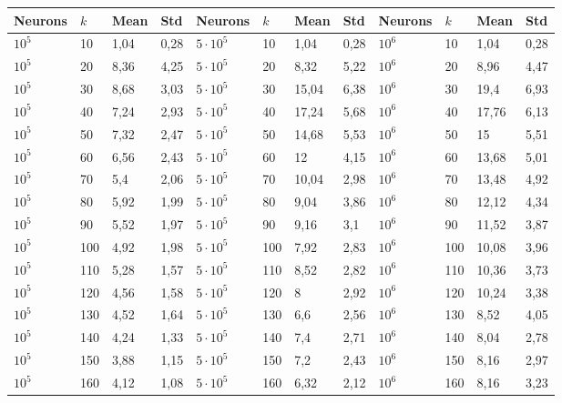 \documentclass[letterpaper]{article}
\begin{document}
\begin{table}
\centering
\begin{tabular}{||l|l|l|l||l|l|l|l||l|l|l|l||}
\hline
\textbf{Neurons}     & $k$  & \textbf{Mean} & \textbf{Std}  & \textbf{Neurons}     & $k$  & \textbf{Mean} & \textbf{Std}  & \textbf{Neurons}     & $k$  & \textbf{Mean} & \textbf{Std}   \\ \hline \hline
$10^5$ & 10  & 1,04 & 0,28 & $5\cdot 10^5$ & 10  & 1,04  & 0,28 & $10^6$ & 10  & 1,04  & 0,28 \\ \hline
$10^5$ & 20  & 8,36 & 4,25 & $5\cdot 10^5$ & 20  & 8,32  & 5,22 & $10^6$ & 20  & 8,96  & 4,47 \\ \hline
$10^5$ & 30  & 8,68 & 3,03 & $5\cdot 10^5$ & 30  & 15,04 & 6,38 & $10^6$ & 30  & 19,4  & 6,93 \\ \hline
$10^5$ & 40  & 7,24 & 2,93 & $5\cdot 10^5$ & 40  & 17,24 & 5,68 & $10^6$ & 40  & 17,76 & 6,13 \\ \hline
$10^5$ & 50  & 7,32 & 2,47 & $5\cdot 10^5$ & 50  & 14,68 & 5,53 & $10^6$ & 50  & 15    & 5,51 \\ \hline
$10^5$ & 60  & 6,56 & 2,43 & $5\cdot 10^5$ & 60  & 12    & 4,15 & $10^6$ & 60  & 13,68 & 5,01 \\ \hline
$10^5$ & 70  & 5,4  & 2,06 & $5\cdot 10^5$ & 70  & 10,04 & 2,98 & $10^6$ & 70  & 13,48 & 4,92 \\ \hline
$10^5$ & 80  & 5,92 & 1,99 & $5\cdot 10^5$ & 80  & 9,04  & 3,86 & $10^6$ & 80  & 12,12 & 4,34 \\ \hline
$10^5$ & 90  & 5,52 & 1,97 & $5\cdot 10^5$ & 90  & 9,16  & 3,1  & $10^6$ & 90  & 11,52 & 3,87 \\ \hline
$10^5$ & 100 & 4,92 & 1,98 & $5\cdot 10^5$ & 100 & 7,92  & 2,83 & $10^6$ & 100 & 10,08 & 3,96 \\ \hline
$10^5$ & 110 & 5,28 & 1,57 & $5\cdot 10^5$ & 110 & 8,52  & 2,82 & $10^6$ & 110 & 10,36 & 3,73 \\ \hline
$10^5$ & 120 & 4,56 & 1,58 & $5\cdot 10^5$ & 120 & 8     & 2,92 & $10^6$ & 120 & 10,24 & 3,38 \\ \hline
$10^5$ & 130 & 4,52 & 1,64 & $5\cdot 10^5$ & 130 & 6,6   & 2,56 & $10^6$ & 130 & 8,52  & 4,05 \\ \hline
$10^5$ & 140 & 4,24 & 1,33 & $5\cdot 10^5$ & 140 & 7,4   & 2,71 & $10^6$ & 140 & 8,04  & 2,78 \\ \hline
$10^5$ & 150 & 3,88 & 1,15 & $5\cdot 10^5$ & 150 & 7,2   & 2,43 & $10^6$ & 150 & 8,16  & 2,97 \\ \hline
$10^5$ & 160 & 4,12 & 1,08 & $5\cdot 10^5$ & 160 & 6,32  & 2,12 & $10^6$ & 160 & 8,16  & 3,23 \\ \hline

\end{tabular}
\end{table}
\end{document}
